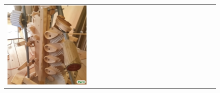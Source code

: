 \begin{figure}[ht!]
\begin{adjustwidth}{-0.8in}{-0.5in}
\begin{tabular}{cccccccccccccccccccc}
\multicolumn{2}{c}{\includegraphics[width=\threebythreecolwidth\textwidth]{figures/cherries/wood3.jpg}} &&


\end{tabular}
\end{adjustwidth}
\end{figure}
